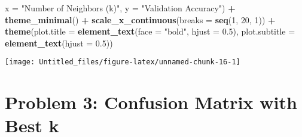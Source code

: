 \documentclass[
]{article}
\newenvironment{Shaded}{\begin{snugshade}}{\end{snugshade}}
\newcommand{\AttributeTok}[1]{\textcolor[rgb]{0.13,0.29,0.53}{#1}}
\newcommand{\DecValTok}[1]{\textcolor[rgb]{0.00,0.00,0.81}{#1}}
\newcommand{\FloatTok}[1]{\textcolor[rgb]{0.00,0.00,0.81}{#1}}
\newcommand{\FunctionTok}[1]{\textcolor[rgb]{0.13,0.29,0.53}{\textbf{#1}}}
\newcommand{\NormalTok}[1]{#1}
\newcommand{\SpecialCharTok}[1]{\textcolor[rgb]{0.81,0.36,0.00}{\textbf{#1}}}
\newcommand{\StringTok}[1]{\textcolor[rgb]{0.31,0.60,0.02}{#1}}
\begin{document}
\begin{Shaded}
\begin{Highlighting}[]
       \AttributeTok{x =} \StringTok{"Number of Neighbors (k)"}\NormalTok{,}
       \AttributeTok{y =} \StringTok{"Validation Accuracy"}\NormalTok{) }\SpecialCharTok{+}
  \FunctionTok{theme\_minimal}\NormalTok{() }\SpecialCharTok{+}
  \FunctionTok{scale\_x\_continuous}\NormalTok{(}\AttributeTok{breaks =} \FunctionTok{seq}\NormalTok{(}\DecValTok{1}\NormalTok{, }\DecValTok{20}\NormalTok{, }\DecValTok{1}\NormalTok{)) }\SpecialCharTok{+}
  \FunctionTok{theme}\NormalTok{(}\AttributeTok{plot.title =} \FunctionTok{element\_text}\NormalTok{(}\AttributeTok{face =} \StringTok{"bold"}\NormalTok{, }\AttributeTok{hjust =} \FloatTok{0.5}\NormalTok{),}
        \AttributeTok{plot.subtitle =} \FunctionTok{element\_text}\NormalTok{(}\AttributeTok{hjust =} \FloatTok{0.5}\NormalTok{))}
\end{Highlighting}
\end{Shaded}

\begin{center}\texttt{[image: Untitled\_files/figure-latex/unnamed-chunk-16-1]} \end{center}

\section{Problem 3: Confusion Matrix with Best
k}\label{problem-3-confusion-matrix-with-best-k}
\end{document}

